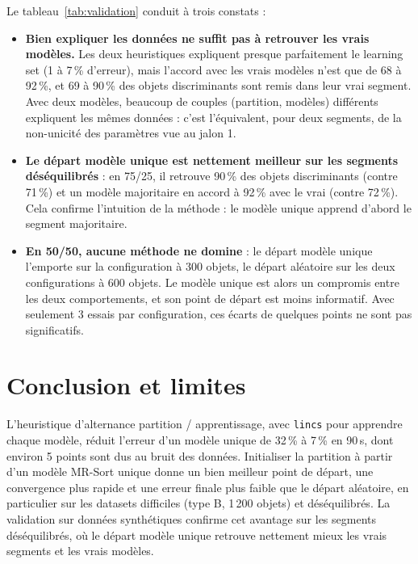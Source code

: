 \documentclass[11pt,a4paper]{article}
\begin{document}
Le tableau~\ref{tab:validation} conduit à trois constats :
\begin{itemize}
  \item \textbf{Bien expliquer les données ne suffit pas à retrouver les vrais modèles.} Les deux heuristiques
        expliquent presque parfaitement le learning set (1 à 7\,\% d'erreur), mais l'accord avec les vrais
        modèles n'est que de 68 à 92\,\%, et 69 à 90\,\% des objets discriminants sont remis dans leur vrai
        segment. Avec deux modèles, beaucoup de couples (partition, modèles) différents expliquent les mêmes
        données : c'est l'équivalent, pour deux segments, de la non-unicité des paramètres vue au jalon 1.
  \item \textbf{Le départ modèle unique est nettement meilleur sur les segments déséquilibrés} : en 75/25, il
        retrouve 90\,\% des objets discriminants (contre 71\,\%) et un modèle majoritaire en accord à 92\,\% avec
        le vrai (contre 72\,\%). Cela confirme l'intuition de la méthode : le modèle unique apprend d'abord le
        segment majoritaire.
  \item \textbf{En 50/50, aucune méthode ne domine} : le départ modèle unique l'emporte sur la configuration à
        300 objets, le départ aléatoire sur les deux configurations à 600 objets. Le modèle unique est alors un
        compromis entre les deux comportements, et son point de départ est moins informatif. Avec seulement
        3 essais par configuration, ces écarts de quelques points ne sont pas significatifs.
\end{itemize}

\section{Conclusion et limites}

L'heuristique d'alternance partition / apprentissage, avec \texttt{lincs} pour apprendre chaque modèle, réduit
l'erreur d'un modèle unique de 32\,\% à 7\,\% en 90\,s, dont environ 5 points sont dus au bruit des données.
Initialiser la partition à partir d'un modèle MR-Sort unique donne un bien meilleur point de départ, une
convergence plus rapide et une erreur finale plus faible que le départ aléatoire, en particulier sur les
datasets difficiles (type B, 1\,200 objets) et déséquilibrés. La validation sur données synthétiques confirme
cet avantage sur les segments déséquilibrés, où le départ modèle unique retrouve nettement mieux les vrais
segments et les vrais modèles.
\end{document}
